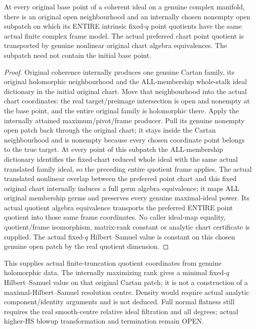 \begin{theorem}
\label{hir:actual-coherent-intrinsic-quotient-frames}
\leanok
{}
At every original base point of a coherent ideal on a genuine complex manifold,
there is an original open neighbourhood and an internally chosen nonempty open
subpatch on which its ENTIRE intrinsic fixed-$q$ point quotients have the same
actual finite complex frame model. The actual preferred chart point quotient
is transported by genuine nonlinear original chart algebra equivalences.
The subpatch need not contain the initial base point.
\end{theorem}
\begin{proof}
Original coherence internally produces one genuine Cartan family, its original
holomorphic neighbourhood and the ALL-membership whole-stalk ideal dictionary
in the initial original chart. Move that neighbourhood into the actual chart
coordinates: the real target/preimage intersection is open and nonempty at the
base point, and the entire original family is holomorphic there. Apply the
internally attained maximum/pivot/frame producer. Pull its genuine nonempty
open patch back through the original chart; it stays inside the Cartan
neighbourhood and is nonempty because every chosen coordinate point belongs
to the true target. At every point of this subpatch the ALL-membership dictionary
identifies the fixed-chart reduced whole ideal with the same actual translated
family ideal, so the preceding entire quotient frame applies. The actual
translated nonlinear overlap between the preferred point chart and this fixed
original chart internally induces a full germ algebra equivalence; it maps
ALL original membership germs and preserves every genuine maximal-ideal power.
Its actual quotient algebra equivalence transports the preferred ENTIRE point
quotient into those same frame coordinates. No caller ideal-map equality,
quotient/frame isomorphism, matrix-rank constant or analytic chart certificate
is supplied. The actual fixed-$q$ Hilbert--Samuel value is constant on this
chosen genuine open patch by the real quotient dimension.
\end{proof}

\begin{remark}
This supplies actual finite-truncation quotient coordinates from genuine
holomorphic data. The internally maximizing rank gives a minimal fixed-$q$
Hilbert--Samuel value on that original Cartan patch; it is not a construction
of a maximal-Hilbert--Samuel resolution centre. Density would require actual
analytic component/identity arguments and is not deduced. Full normal flatness
still requires the real smooth-centre relative ideal filtration and all degrees;
actual higher-HS blowup transformation and termination remain OPEN.
\end{remark}
